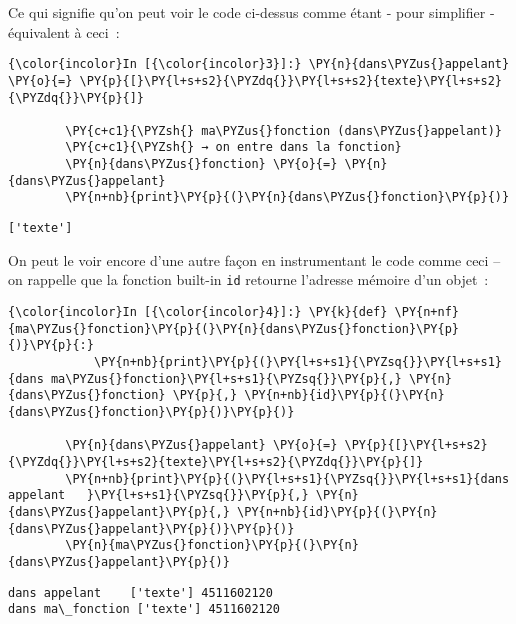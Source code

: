     Ce qui signifie qu'on peut voir le code ci-dessus comme étant - pour
simplifier - équivalent à ceci~:

    \begin{Verbatim}[commandchars=\\\{\},frame=single,framerule=0.3mm,rulecolor=\color{cellframecolor}]
{\color{incolor}In [{\color{incolor}3}]:} \PY{n}{dans\PYZus{}appelant} \PY{o}{=} \PY{p}{[}\PY{l+s+s2}{\PYZdq{}}\PY{l+s+s2}{texte}\PY{l+s+s2}{\PYZdq{}}\PY{p}{]}
        
        \PY{c+c1}{\PYZsh{} ma\PYZus{}fonction (dans\PYZus{}appelant)}
        \PY{c+c1}{\PYZsh{} → on entre dans la fonction}
        \PY{n}{dans\PYZus{}fonction} \PY{o}{=} \PY{n}{dans\PYZus{}appelant}
        \PY{n+nb}{print}\PY{p}{(}\PY{n}{dans\PYZus{}fonction}\PY{p}{)}
\end{Verbatim}


    \begin{Verbatim}[commandchars=\\\{\},frame=single,framerule=0.3mm,rulecolor=\color{cellframecolor}]
['texte']
\end{Verbatim}

    On peut le voir encore d'une autre façon en instrumentant le code comme
ceci -- on rappelle que la fonction built-in \texttt{id} retourne
l'adresse mémoire d'un objet~:

    \begin{Verbatim}[commandchars=\\\{\},frame=single,framerule=0.3mm,rulecolor=\color{cellframecolor}]
{\color{incolor}In [{\color{incolor}4}]:} \PY{k}{def} \PY{n+nf}{ma\PYZus{}fonction}\PY{p}{(}\PY{n}{dans\PYZus{}fonction}\PY{p}{)}\PY{p}{:}
            \PY{n+nb}{print}\PY{p}{(}\PY{l+s+s1}{\PYZsq{}}\PY{l+s+s1}{dans ma\PYZus{}fonction}\PY{l+s+s1}{\PYZsq{}}\PY{p}{,} \PY{n}{dans\PYZus{}fonction} \PY{p}{,} \PY{n+nb}{id}\PY{p}{(}\PY{n}{dans\PYZus{}fonction}\PY{p}{)}\PY{p}{)}
            
        \PY{n}{dans\PYZus{}appelant} \PY{o}{=} \PY{p}{[}\PY{l+s+s2}{\PYZdq{}}\PY{l+s+s2}{texte}\PY{l+s+s2}{\PYZdq{}}\PY{p}{]}
        \PY{n+nb}{print}\PY{p}{(}\PY{l+s+s1}{\PYZsq{}}\PY{l+s+s1}{dans appelant   }\PY{l+s+s1}{\PYZsq{}}\PY{p}{,} \PY{n}{dans\PYZus{}appelant}\PY{p}{,} \PY{n+nb}{id}\PY{p}{(}\PY{n}{dans\PYZus{}appelant}\PY{p}{)}\PY{p}{)}
        \PY{n}{ma\PYZus{}fonction}\PY{p}{(}\PY{n}{dans\PYZus{}appelant}\PY{p}{)}
\end{Verbatim}


    \begin{Verbatim}[commandchars=\\\{\},frame=single,framerule=0.3mm,rulecolor=\color{cellframecolor}]
dans appelant    ['texte'] 4511602120
dans ma\_fonction ['texte'] 4511602120
\end{Verbatim}

